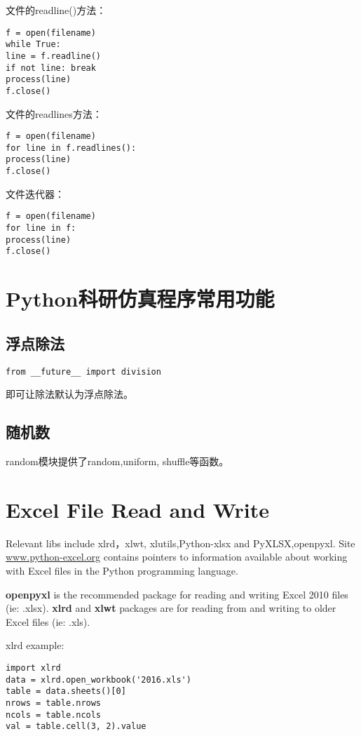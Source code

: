 文件的readline()方法：

\begin{verbatim}
f = open(filename)
while True:
line = f.readline()
if not line: break
process(line)
f.close()
\end{verbatim}

文件的readlines方法：
\begin{verbatim}
f = open(filename)
for line in f.readlines():
process(line)
f.close()
\end{verbatim}

文件迭代器：
\begin{verbatim}
f = open(filename)
for line in f:
process(line)
f.close()
\end{verbatim}

\section{Python科研仿真程序常用功能}

\subsection{浮点除法}
\begin{lstlisting}
from __future__ import division
\end{lstlisting}
即可让除法默认为浮点除法。
\subsection{随机数}
random模块提供了random,uniform, shuffle等函数。


\section{Excel File Read and Write}
Relevant libs include xlrd，xlwt, xlutils,Python-xlsx and PyXLSX,openpyxl.
Site \url{www.python-excel.org} contains pointers to information available about working with Excel files in the Python
programming language.

\textbf{openpyxl} is the recommended package for reading and writing Excel 2010
files (ie: .xlsx). 
\textbf{xlrd} and \textbf{xlwt} packages are for reading from and writing to
older Excel files (ie: .xls).
 

xlrd example:
\begin{lstlisting}
import xlrd
data = xlrd.open_workbook('2016.xls')
table = data.sheets()[0]
nrows = table.nrows
ncols = table.ncols
val = table.cell(3, 2).value
\end{lstlisting}

